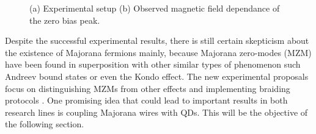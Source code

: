 \begin{figure}[t]
\centering

\caption{ (a) Experimental setup (b) Observed magnetic field dependance of the zero bias peak.  \label{fig:exp}\protect{}}
\end{figure}

Despite the successful experimental results, there is still certain  skepticism about the existence of Majorana fermions mainly, because Majorana zero-modes (MZM) have been found in superposition with other similar types of phenomenon such Andreev bound states or even the Kondo effect. \cite{lee_zero-bias_2012} The new experimental proposals focus on distinguishing MZMs from other effects and implementing  braiding protocols \cite{aasen_milestones_2016,sarma_majorana_2015,heck_coulomb-assisted_2012} . One promising idea that could lead to important results in both research lines is coupling Majorana wires with QDs. This will be the objective of the following section. 


